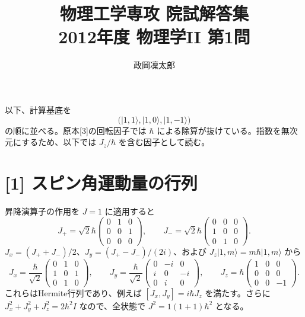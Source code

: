 \documentclass[11pt,a4paper]{article}
\title{物理工学専攻 院試解答集\\2012年度 物理学II 第1問}
\author{政岡凜太郎}
\date{}
\begin{document}
\maketitle

以下、計算基底を
\begin{equation}
  \bigl(|1,1\rangle,|1,0\rangle,|1,-1\rangle\bigr)
\end{equation}
の順に並べる。原本[3]の回転因子では $\hbar$ による除算が抜けている。指数を無次元にするため、以下では $J_z/\hbar$ を含む因子として読む。

\section*{[1] スピン角運動量の行列}
昇降演算子の作用を $J=1$ に適用すると
\begin{equation}
  J_+=\sqrt{2}\hbar
  \begin{pmatrix}0&1&0\\0&0&1\\0&0&0\end{pmatrix},\qquad
  J_-=\sqrt{2}\hbar
  \begin{pmatrix}0&0&0\\1&0&0\\0&1&0\end{pmatrix}.
\end{equation}
$J_x=(J_++J_-)/2$、$J_y=(J_+-J_-)/(2i)$、および $J_z|1,m\rangle=m\hbar|1,m\rangle$ から
\begin{equation}
  \boxed{J_x=\frac{\hbar}{\sqrt{2}}
  \begin{pmatrix}0&1&0\\1&0&1\\0&1&0\end{pmatrix}},\qquad
  \boxed{J_y=\frac{\hbar}{\sqrt{2}}
  \begin{pmatrix}0&-i&0\\i&0&-i\\0&i&0\end{pmatrix}},\qquad
  \boxed{J_z=\hbar
  \begin{pmatrix}1&0&0\\0&0&0\\0&0&-1\end{pmatrix}}.
\end{equation}
これらはHermite行列であり、例えば $[J_x,J_y]=i\hbar J_z$ を満たす。さらに $J_x^2+J_y^2+J_z^2=2\hbar^2 I$ なので、全状態で $J^2=1(1+1)\hbar^2$ となる。
\end{document}
